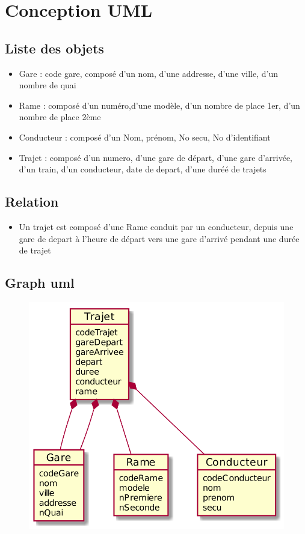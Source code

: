 \section{Conception UML}
\subsection{Liste des objets}
\begin{itemize}
\item Gare : code gare, composé d'un nom, d'une addresse, d'une ville, d'un nombre de quai
\item Rame : composé d'un numéro,d'une modèle, d'un nombre de place 1er, d'un nombre de place 2ème
\item Conducteur : composé d'un Nom, prénom, No secu, No d'identifiant

\item Trajet : composé d'un numero, d'une gare de départ, d'une gare d'arrivée, d'un train, d'un conducteur, date de depart, d'une duréé de trajets

\end{itemize}

\subsection{Relation}
\begin{itemize}
\item Un trajet est composé d'une Rame conduit par un conducteur, depuis une gare de depart à l'heure de départ vers une gare d'arrivé pendant une durée de trajet
\end{itemize}
\subsection{Graph uml}
\begin{figure}[h]
   \includegraphics[width=1.0\textwidth]{uml.png}
\end{figure}
